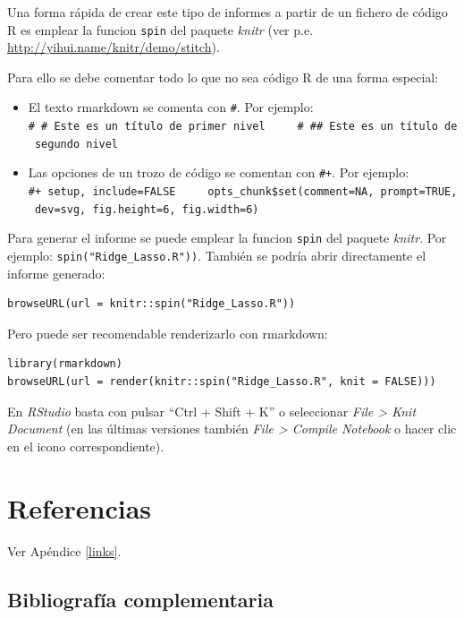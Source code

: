 \documentclass[
]{book}
\providecommand{\tightlist}{%
  \setlength{\itemsep}{0pt}\setlength{\parskip}{0pt}}
\theoremstyle{break}
\begin{document}
Una forma rápida de crear este tipo de informes a partir de un fichero de código R es emplear la funcion
\texttt{spin} del paquete \emph{knitr} (ver p.e. \url{http://yihui.name/knitr/demo/stitch}).

Para ello se debe comentar todo lo que no sea código R de una forma especial:

\begin{itemize}
\tightlist
\item
  El texto rmarkdown se comenta con \texttt{\#\textquotesingle{}}. Por ejemplo:
  \texttt{\#\textquotesingle{}\ \#\ Este\ es\ un\ título\ de\ primer\ nivel\ \ \ \ \ \#\textquotesingle{}\ \#\#\ Este\ es\ un\ título\ de\ segundo\ nivel}
\item
  Las opciones de un trozo de código se comentan con \texttt{\#+}. Por ejemplo:
  \texttt{\#+\ setup,\ include=FALSE\ \ \ \ \ opts\_chunk\$set(comment=NA,\ prompt=TRUE,\ dev=\textquotesingle{}svg\textquotesingle{},\ fig.height=6,\ fig.width=6)}
\end{itemize}

Para generar el informe se puede emplear la funcion \texttt{spin} del paquete \emph{knitr}. Por ejemplo: \texttt{spin("Ridge\_Lasso.R"))}.
También se podría abrir directamente el informe generado:

\begin{verbatim}
browseURL(url = knitr::spin("Ridge_Lasso.R"))
\end{verbatim}

Pero puede ser recomendable renderizarlo con rmarkdown:

\begin{verbatim}
library(rmarkdown)
browseURL(url = render(knitr::spin("Ridge_Lasso.R", knit = FALSE)))
\end{verbatim}

En \emph{RStudio} basta con pulsar ``Ctrl + Shift + K'' o seleccionar \emph{File \textgreater{} Knit Document} (en las últimas versiones también \emph{File \textgreater{} Compile Notebook} o hacer clic en el icono correspondiente).

\hypertarget{referencias}{%
\chapter*{Referencias}\label{referencias}}

Ver Apéndice \ref{links}.

\hypertarget{bibliografuxeda-complementaria}{%
\section*{Bibliografía complementaria}\label{bibliografuxeda-complementaria}}
\end{document}
